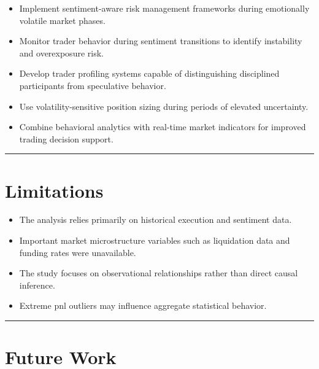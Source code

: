 \documentclass[11pt,a4paper]{article}
\begin{document}
\begin{itemize}
    \item Implement sentiment-aware risk management frameworks during emotionally volatile market phases.

    \item Monitor trader behavior during sentiment transitions to identify instability and overexposure risk.

    \item Develop trader profiling systems capable of distinguishing disciplined participants from speculative behavior.

    \item Use volatility-sensitive position sizing during periods of elevated uncertainty.

    \item Combine behavioral analytics with real-time market indicators for improved trading decision support.
\end{itemize}


\vspace{0.5cm}
\hrule
\vspace{0.3cm}

\section{Limitations}

\begin{itemize}
    \item The analysis relies primarily on historical execution and sentiment data.

    \item Important market microstructure variables such as liquidation data and funding rates were unavailable.

    \item The study focuses on observational relationships rather than direct causal inference.

    \item Extreme pnl outliers may influence aggregate statistical behavior.
\end{itemize}


\vspace{0.5cm}
\hrule
\vspace{0.3cm}

\section{Future Work}
\end{document}
